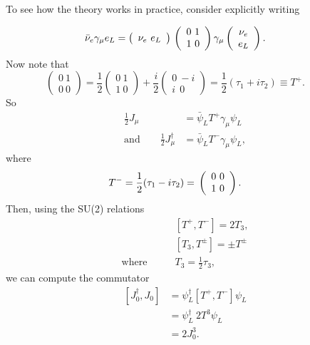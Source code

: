 \documentclass[a4paper,12pt]{article}
\begin{document}
To see how the theory works in practice, consider explicitly writing

\[ \bar{\nu}_e\gamma_\mu e_L= \left( \begin{array}{c}
\nu_e \ e_L   \end{array} \right)
  \\ \left( \begin{array}{cc}
 0 \ 1 \\
1 \ 0   \end{array} \right)\gamma_\mu \\ 
\left( \begin{array}{cc}
 \nu_e \\
e_L   \end{array} \right). \qquad\] 
Now note that 
\[ \left( \begin{array}{cc}
 0 \ 1 \\
0 \ 0   \end{array} \right) = \frac{1}{2} 
\left( \begin{array}{cc}
 0 \ 1 \\
1 \ 0   \end{array} \right) + \frac{i}{2}
\left( \begin{array}{cc}
 0 \ -i \\
i \ \ 0   \end{array} \right) = \frac{1}{2}(\tau_1 + i\tau_2) \equiv T^+.
\qquad\] 
So
\begin{equation}
\begin{split}
\frac{1}{2}J_\mu &= \bar{\psi}_L T^+ \gamma_\mu \psi_L \\
\text{and} \qquad \frac{1}{2}J_\mu^\dagger &= \bar{\psi}_L T^- \gamma_\mu \psi_L,
\end{split}
\end{equation}
where 
\[ T^- = \frac{1}{2}(\tau_1 - i\tau_2) =
  \\ \left( \begin{array}{cc}
 0 \ 0 \\
1 \ 0   \end{array} \right). \qquad\]
Then, using the SU(2) relations
\begin{equation}
\begin{split}
&[T^+,T^-] = 2T_3, \\
&[T_3, T^\pm] = \pm T^\pm \\
\text{where} \qquad &T_3 = \frac{1}{2}\tau_3,
\end{split}
\end{equation}
we can compute the commutator
\begin{equation}
\begin{split}
[J_0^\dagger, J_0] &= \psi_L^\dagger[T^+,T^-]\psi_L \\
&=\psi_L^\dagger \ 2T^3 \psi_L \\
&= 2J_0^3.
\end{split}
\end{equation}
\end{document}
